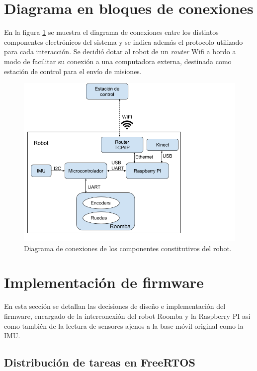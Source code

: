 \section{Diagrama en bloques de conexiones}

En la figura \ref{fig:lubobotConexiones} se muestra el diagrama de conexiones entre los distintos componentes electrónicos del sistema y se indica además el protocolo utilizado para cada interacción. Se decidió dotar al robot de un \textit{router} Wifi a bordo a modo de facilitar su conexión a una computadora externa, destinada como estación de control para el envío de misiones.

\begin{figure}[ht]
  \centering
  \includegraphics[scale=0.5]{./Figures/lubobot_conexiones.png}
  \caption{Diagrama de conexiones de los componentes constitutivos del robot.}
  \label{fig:lubobotConexiones}
\end{figure}

\newpage

\section{Implementación de firmware}

En esta sección se detallan las decisiones de diseño e implementación del firmware, encargado de la interconexión del robot Roomba y la Raspberry PI así como también de la lectura de sensores ajenos a la base móvil original como la IMU.

\subsection{Distribución de tareas en FreeRTOS}

